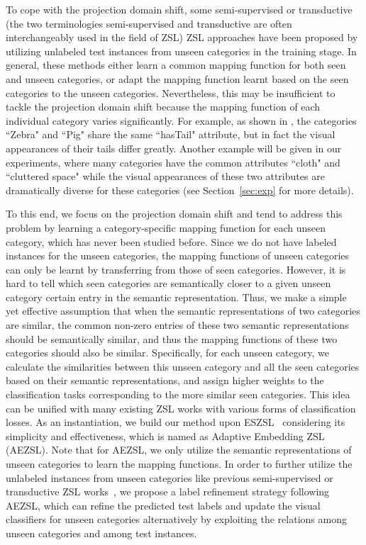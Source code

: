 \documentclass[journal]{IEEEtran}
\begin{document}
To cope with the projection domain shift, some semi-supervised or transductive (the two terminologies semi-supervised and transductive are often interchangeably used in the field of ZSL) ZSL approaches have been proposed by utilizing  unlabeled test instances from unseen categories in the training stage. In general, these methods either learn a common mapping function for both seen and unseen categories, or adapt the mapping function learnt based on the seen categories to the unseen categories. Nevertheless, this may be insufficient to tackle the projection domain shift because the mapping function of each individual category varies significantly. For example, as shown in \cite{fu2014transductive}, the categories ``Zebra" and ``Pig" share the same ``hasTail" attribute, but in fact the visual appearances of their tails differ greatly. Another example will be given in our experiments, where many categories have the common attributes ``cloth" and ``cluttered space" while the visual appearances of these two attributes are dramatically diverse for these categories (see Section~\ref{sec:exp} for more details). 

To this end, we focus on the projection domain shift and tend to address this problem by learning a category-specific mapping function for each unseen category, which has never been studied before. Since we do not have labeled instances for the unseen categories, the mapping functions of unseen categories can only be learnt by transferring from those of seen categories. However, it is hard to tell which seen categories are semantically closer to a given unseen category \wrt certain entry in the semantic representation. Thus, we make a simple yet effective assumption that when the semantic representations of two categories are similar, the common non-zero entries of these two semantic representations should be semantically similar, and thus the mapping functions of these two categories should also be similar. Specifically, for each unseen category, we calculate the similarities between this unseen category and all the seen categories based on their semantic representations, and assign higher weights to the classification tasks corresponding to the more similar seen categories. This idea can be unified with many existing ZSL works with various forms of classification losses. As an instantiation, we build our method upon ESZSL~\cite{romera2015embarrassingly} considering its simplicity and effectiveness, which is named as Adaptive Embedding ZSL (AEZSL). Note that for AEZSL, we only utilize the semantic representations of unseen categories to learn the mapping functions. In order to further utilize the unlabeled instances from unseen categories like previous semi-supervised or transductive ZSL works~\cite{fu2014transductive, xu2017transductive, kodirov2015unsupervised,shojaee2016semi,li2015max}, we propose a label refinement strategy following AEZSL, which can refine the predicted test labels and update the visual classifiers for unseen categories alternatively by exploiting the relations among unseen categories and among test instances. 
\end{document}
